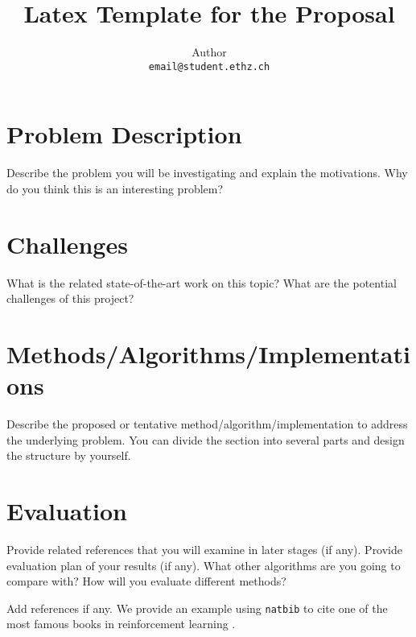 \documentclass{article}
\title{Latex Template for the Proposal}
\author{
    Author \\
    \texttt{email@student.ethz.ch} \\
}
\begin{document}
\maketitle

\section{Problem Description}
Describe the problem you will be investigating and explain the motivations. Why do you think this is an interesting problem?


\section{Challenges}
What is the related state-of-the-art work on this topic? What are the potential challenges of this project?


\section{Methods/Algorithms/Implementations}
Describe the proposed or tentative method/algorithm/implementation to address the underlying problem. You can divide the section into several parts and design the structure by yourself.


\section{Evaluation}
Provide related references that you will examine in later stages (if any). Provide evaluation plan of your results (if any). What other algorithms are you going to compare with? How will you evaluate different methods?


\medskip



Add references if any. We provide an example using \texttt{natbib} to cite one of the most famous books in reinforcement learning \cite{sutton2018reinforcement}.
\end{document}
